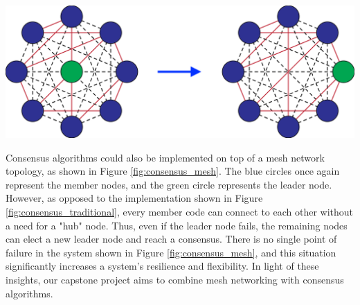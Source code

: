 \begingroup
    \centering
    \medskip
    \includegraphics[width=0.5\columnwidth]{final-proposal/images/consensus_mesh.png}
    \label{fig:consensus_mesh}
\endgroup

Consensus algorithms could also be implemented on top of a mesh network topology, as shown in Figure \ref{fig:consensus_mesh}. The blue circles once again represent the member nodes, and the green circle represents the leader node. However, as opposed to the implementation shown in Figure \ref{fig:consensus_traditional}, every member code can connect to each other without a need for a "hub" node. Thus, even if the leader node fails, the remaining nodes can elect a new leader node and reach a consensus. There is no single point of failure in the system shown in Figure \ref{fig:consensus_mesh}, and this situation significantly increases a system's resilience and flexibility. In light of these insights, our capstone project aims to combine mesh networking with consensus algorithms.